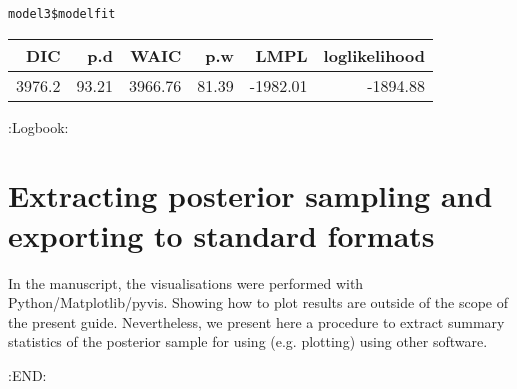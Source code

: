 \documentclass[11pt]{article}
\begin{document}
\begin{verbatim}
model3$modelfit
\end{verbatim}

\begin{center}
\begin{tabular}{rrrrrr}
DIC & p.d & WAIC & p.w & LMPL & loglikelihood\\
\hline
3976.2 & 93.21 & 3966.76 & 81.39 & -1982.01 & -1894.88\\
\end{tabular}
\end{center}

:Logbook:
\section{Extracting posterior sampling and exporting to standard formats}
\label{sec:orge630661}
In the manuscript, the visualisations were performed with Python/Matplotlib/pyvis. Showing how to plot results are outside of the scope of the present guide. Nevertheless, we present here a procedure to extract summary statistics of the posterior sample for using (e.g. plotting) using other software.


:END:





\end{document}
